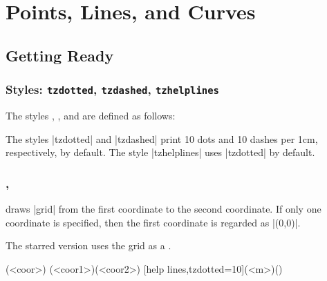 %

\part{Points, Lines, and Curves}
\label{p:linesandcurves}


\chapter{Getting Ready}
\label{c:gettingready}

\section{Styles: \texttt{tzdotted}, \texttt{tzdashed}, \texttt{tzhelplines}}
\label{s:styles:tzhelplines}

The styles , , and  are defined as follows:

\begin{tzsty}
\end{tzsty}

The styles |tzdotted| and |tzdashed| print 10 dots and 10 dashes per 1cm, respectively, by default.
The style |tzhelplines| uses |tzdotted| by default.


\section{\protect\cmd{\tzhelplines}, \protect\cmd{\tzhelplines*}}
\label{s:tzhelplines}

\icmd{\tzhelplines} draws |grid| from the first coordinate to the second coordinate.
If only one coordinate is specified, then the first coordinate is regarded as |(0,0)|.

The starred version \icmd{\tzhelplines*} uses the grid as a .

\begin{tzdef}
\tzhelplines(<coor>)
\tzhelplines[<opt>](<coor1>)(<coor2>)
  [help lines,tzdotted=10](<m>)()
\end{tzdef}


